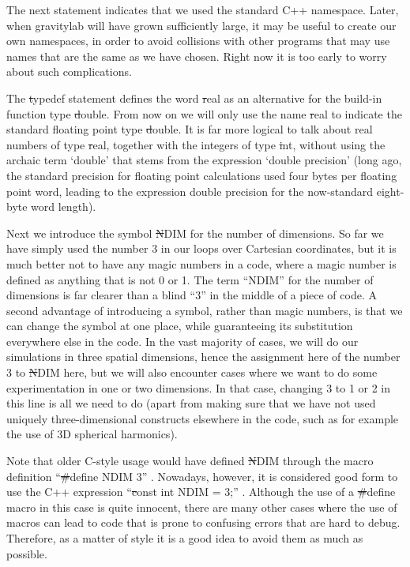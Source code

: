 The next statement indicates that we used the standard C++ namespace.
Later, when gravitylab will have grown sufficiently large, it may be
useful to create our own namespaces, in order to avoid collisions with
other programs that may use names that are the same as we have chosen.
Right now it is too early to worry about such complications.

The {\st typedef} statement defines the word {\st real} as an
alternative for the build-in function type {\st double}.  From now on
we will only use the name {\st real} to indicate the standard floating
point type {\st double}.  It is far more logical to talk about real
numbers of type {\st real}, together with the integers of type {\st int},
without using the archaic term `double' that stems from the expression
`double precision' (long ago, the standard precision for floating
point calculations used four bytes per floating point word, leading to
the expression double precision for the now-standard eight-byte word
length).

Next we introduce the symbol {\st NDIM} for the number of dimensions.
So far we have simply used the number 3 in our loops over Cartesian
coordinates, but it is much better not to have any magic numbers in a
code, where a magic number is defined as anything that is not 0 or 1.
The term ``NDIM'' for the number of dimensions is far clearer than a
blind ``3'' in the middle of a piece of code.  A second advantage of
introducing a symbol, rather than magic numbers, is that we can change
the symbol at one place, while guaranteeing its substitution
everywhere else in the code.  In the vast majority of cases, we will
do our simulations in three spatial dimensions, hence the assignment
here of the number 3 to {\st NDIM} here, but we will also encounter
cases where we want to do some experimentation in one or two dimensions.
In that case, changing 3 to 1 or 2 in this line is all we need to do
(apart from making sure that we have not used uniquely three-dimensional
constructs elsewhere in the code, such as for example the use of
3D spherical harmonics).

Note that older C-style usage would have defined {\st NDIM} through
the macro definition ``{\st \#define NDIM 3}'' .  Nowadays, however,
it is considered good form to use the C++ expression ``{\st const int
NDIM = 3;}'' .  Although the use of a {\st \#define} macro in this
case is quite innocent, there are many other cases where the use of
macros can lead to code that is prone to confusing errors that are
hard to debug.  Therefore, as a matter of style it is a good idea to
avoid them as much as possible.

